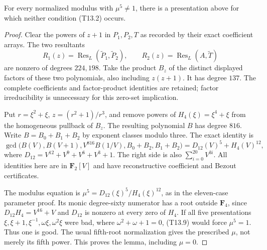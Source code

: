 \begin{lemma}
\label{lem:uniform-thirteen-generic-parameters-candidate}
For every normalized modulus with $\mu^5\ne1$, there is a presentation
above for which neither condition (T13.2) occurs.
\end{lemma}
\begin{proof}
Clear the powers of $z+1$ in $P_1,P_2,T$ as recorded by their exact
coefficient arrays. The two resultants
\[
 R_1(z)=\operatorname{Res}_L(\widetilde P_1,\widetilde P_2),
 \qquad R_2(z)=\operatorname{Res}_L(A,\widetilde T)
\tag{T13.8}
\]
are nonzero of degrees $224,198$. Take the product $B_z$ of the
distinct displayed factors of these two polynomials, also including
$z(z+1)$. It has degree $137$. The complete coefficients and
factor-product identities are retained; factor irreducibility is
unnecessary for this zero-set implication.

Put $r=\xi^2+\xi$, $z=(r^2+1)/r^3$, and remove powers of
$H_4(\xi)=\xi^4+\xi$ from the homogeneous pullback of $B_z$.
The resulting polynomial $B$ has degree $816$. Write
$B=B_0+B_1+B_2$ by exponent classes modulo three. The exact identity is
\[
\gcd\bigl(B(V),B(V+1),V^{816}B(1/V),B_0+B_2,B_1+B_2\bigr)
       =D_{12}(V)^5+H_4(V)^{12},
\tag{T13.9}
\]
where $D_{12}=V^{12}+V^9+V^6+V^3+1$.
The right side is also $\sum_{i=0}^{20}V^{3i}$.
All identities here are in $\mathbf F_2[V]$ and have reconstructive
coefficient and Bezout certificates.

The modulus equation is
$\mu^5=D_{12}(\xi)^5/H_4(\xi)^{12}$, as in the eleven-case
parameter proof. Its monic degree-sixty numerator has a root
outside $\mathbf F_4$, since $D_{12}H_4=V^{16}+V$ and $D_{12}$
is nonzero at every zero of $H_4$. If all five presentations
$\xi,\xi+1,\xi^{-1},\omega\xi,\omega^2\xi$ were bad, where
$\omega^2+\omega+1=0$, (T13.9) would force $\mu^5=1$.
Thus one is good. The usual fifth-root normalization gives the
prescribed $\mu$, not merely its fifth power. This proves the lemma,
including $\mu=0$.
\end{proof}

